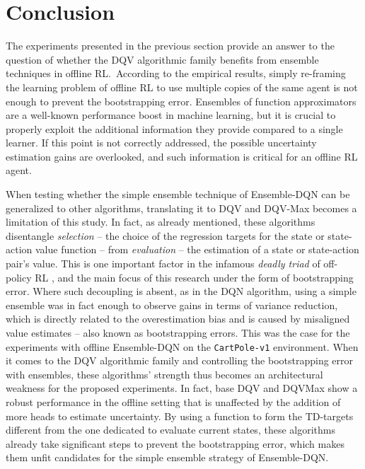 \section{Conclusion}\label{sec:Conclusion}
The experiments presented in the previous section provide an answer to the
question of whether the DQV algorithmic family benefits from ensemble
techniques in offline RL.\ According to the
empirical results, simply re-framing the learning problem of
offline RL to use multiple copies of the same agent is not enough to
prevent the bootstrapping error. Ensembles of function approximators
are a well-known performance boost in machine learning, but it is
crucial to properly exploit the additional information they provide
compared to a single learner. If this point is not correctly
addressed, the possible uncertainty estimation gains are overlooked,
and such information is critical for an offline RL agent.

When testing whether the simple ensemble technique of Ensemble-DQN can
be generalized to other algorithms, translating it to DQV and DQV-Max
becomes a limitation of this study. In fact, as already mentioned,
these algorithms disentangle \textit{selection} -- the choice of the
regression targets for the state or state-action value function --
from \textit{evaluation} -- the estimation of a state or
state-action pair's value. This is one important factor in the infamous
\textit{deadly triad} of off-policy RL
\citep{sutton2018reinforcement}, and the main focus of this research
under the form of bootstrapping error. Where such decoupling is absent,
as in the DQN algorithm, using a simple ensemble was in fact enough to
observe gains in terms of variance reduction, which is directly
related to the overestimation bias \citep{anschel2017averaged} and is
caused by misaligned value estimates -- also known as bootstrapping
errors. This was the case for the experiments with offline
Ensemble-DQN on the \texttt{CartPole-v1} environment. When it comes to
the DQV algorithmic family and controlling the bootstrapping error
with ensembles, these algorithms' strength thus becomes an
architectural weakness for the proposed experiments. In fact, base DQV
and DQVMax show a robust performance in the offline setting that is
unaffected by the addition of more heads to estimate uncertainty.
By using a function to form the TD-targets different from the one
dedicated to evaluate current states, these algorithms already
take significant steps to prevent the bootstrapping error, which
makes them unfit candidates for the simple ensemble strategy of
Ensemble-DQN.\

